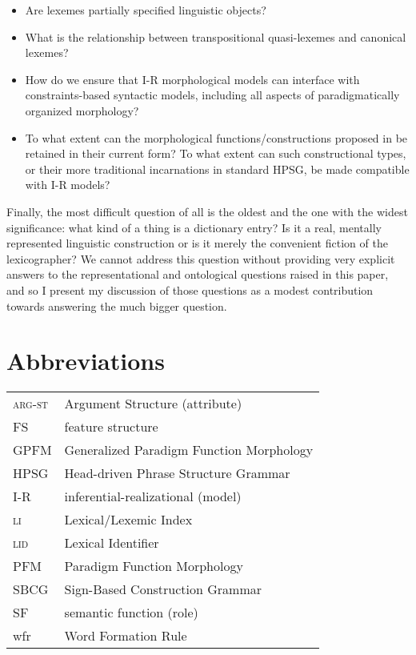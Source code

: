 \documentclass[output=paper]{langsci/langscibook}
\begin{document}
\begin{itemize}

\item	Are lexemes partially specified linguistic objects?

\item	What is the relationship between transpositional quasi-lexemes and canonical lexemes?

\item		How do we ensure that I-R morphological models can interface with constraints-based syntactic models, including all aspects of paradigmatically organized morphology?

\item	To what extent can the morphological functions/constructions proposed in %
\citet{Sag12} %
%
be retained in their current form? To what extent can such constructional types, or their more traditional incarnations in standard HPSG, be made compatible with I-R models?

\end{itemize}

Finally, the most difficult question of all is the oldest and the one with the widest significance: what kind of a thing is a dictionary entry? Is it a real, mentally represented linguistic construction or is it merely the convenient fiction of the lexicographer? We cannot address this question without providing very explicit answers to the representational and ontological questions raised in this paper, and so I present my discussion of those questions as a modest contribution towards answering the much bigger question.








\section*{Abbreviations}

\begin{tabular}{ll}
\textsc{arg-st}		&Argument Structure (attribute)\\
FS 			&feature structure\\
GPFM     		&Generalized Paradigm Function Morphology\\
HPSG	     		&Head-driven Phrase Structure Grammar\\
I-R     			&inferential-realizational (model)\\
\textsc{li}			&Lexical/Lexemic Index\\
\textsc{lid}			&Lexical Identifier\\
PFM     		&Paradigm Function Morphology\\
SBCG     		&Sign-Based Construction Grammar\\
SF     			& semantic function (role)\\
wfr			&Word Formation Rule
\end{tabular}

 {\sloppy
 \printbibliography[heading=subbibliography,notkeyword=this]
 }
\end{document}
